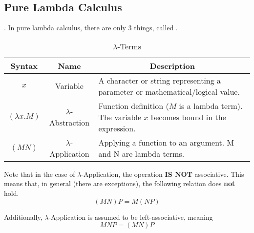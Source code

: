 \subsection{Pure Lambda Calculus}\label{subsec:Pure_Lambda_Calculus}.
In pure lambda calculus, there are only 3 things, called .

\begin{table}[h!tbp]
  \centering
  \begin{tabular}{ccp{15cm}}
    \toprule
    Syntax & Name & \multicolumn{1}{c}{Description} \\
    \midrule
    $x$ & Variable & A character or string representing a parameter or mathematical/logical value. \\
$ (\lambda x. M)$ & $\lambda$-Abstraction & Function definition ($M$ is a lambda term). The variable $x$ becomes bound in the expression. \\
    $(M N)$ & $\lambda$-Application & Applying a function to an argument. M and N are lambda terms. \\
    \bottomrule
  \end{tabular}
\caption{$\lambda$-Terms}
\label{tab:Lambda_Terms}
\end{table}

Note that in the case of $\lambda$-Application, the operation \textbf{IS NOT} associative.
This means that, in general (there are exceptions), the following relation does \textbf{not} hold.
\begin{equation*}
  (MN) P = M(NP)
\end{equation*}

Additionally, $\lambda$-Application is assumed to be left-associative, meaning
\begin{equation*}
  MNP = (MN) P
\end{equation*}


